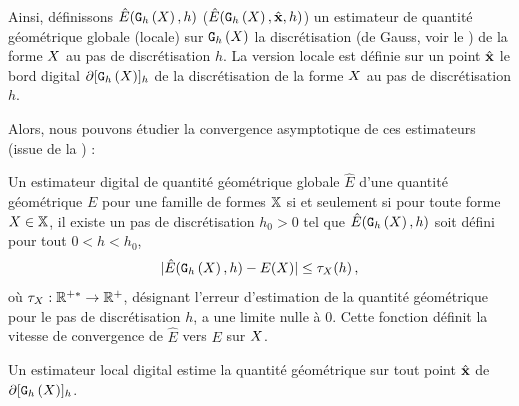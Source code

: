 Ainsi, définissons $\hat{E}(\mathtt{G}_{h}\left(X\right),h)$ (\respp $\hat{E}(\mathtt{G}_{h}\left(X\right),\hat{\mathbf{x}},h)$) un
estimateur de quantité géométrique globale (\resp locale) sur $\mathtt{G}_{h}\left(X\right)$ la
discrétisation (de Gauss, voir le ) de la forme
$X$ au pas de discrétisation $h$. La version locale est définie sur un
point $\hat{\mathbf{x}}$ le bord digital $\partial\lbrack \mathtt{G}_{h}\left(X\right) \rbrack_{h}$ de la discrétisation
de la forme $X$ au pas de discrétisation $h$.


Alors, nous pouvons étudier la convergence asymptotique de ces estimateurs
(issue de la ) :
%
\begin{definition}{}
  \label{def:multigrid-convergence-global}
  Un estimateur digital de quantité géométrique globale $\hat{E}$ d'une quantité
  géométrique $E$  pour une famille de
  formes $\mathbb{X}$ si et seulement si pour toute forme $X \in \mathbb{X}$, il
  existe un pas de discrétisation $h_0 > 0$ tel que
  $\hat{E}(\mathtt{G}_{h}\left(X\right),h)$ soit défini pour tout $0 < h < h_0$,
  \begin{equation}
    | \hat{E}(\mathtt{G}_{h}\left(X\right),h) - E(X) | \le \tau_{X}(h) \,,
  \end{equation}
  où $\tau_{X}: \mathbb{R}^{+*} \rightarrow \mathbb{R}^+$, désignant l'erreur d'estimation
  de la quantité géométrique pour le pas de discrétisation $h$, a une limite
  nulle à $0$. Cette fonction définit la vitesse de convergence de $\hat{E}$
  vers $E$ sur $X$.
\end{definition}
%
%
Un estimateur local digital estime la quantité géométrique sur tout point
$\hat{\mathbf{x}}$ de $\partial\lbrack \mathtt{G}_{h}\left(X\right) \rbrack_{h}$.
%

